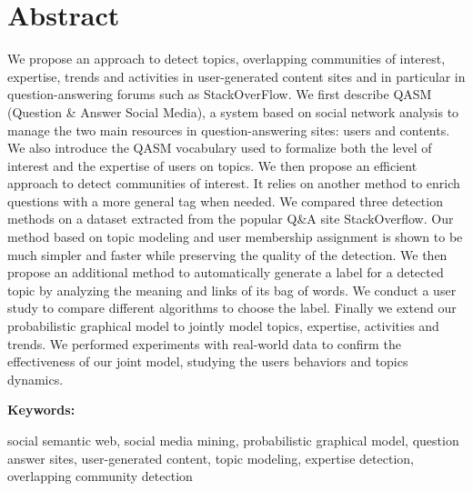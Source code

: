 \documentclass[a4paper,11pt,twoside]{ThesisStyle}
\begin{document}
\section*{Abstract}
We propose an approach to detect topics, overlapping communities of interest, expertise, trends and activities in user-generated content sites and in particular in question-answering forums such as StackOverFlow. We first describe QASM (Question \& Answer Social Media), a system based on social network analysis to manage the two main resources in question-answering sites: users and contents. We also introduce the QASM vocabulary used to formalize both the level of interest and the expertise of users on topics. We then propose an efficient approach to detect communities of interest. It relies on another method to enrich questions with a more general tag when needed.  We compared three detection methods on a dataset extracted from the popular Q\&A site StackOverflow. Our method based on topic modeling and user membership assignment is shown to be much simpler and faster while preserving the quality of the detection. We then propose an additional method to automatically generate a label for a detected topic by analyzing the meaning and links of its bag of words. We conduct a user study to compare different algorithms to choose the label. Finally we extend our probabilistic graphical model to jointly model topics, expertise, activities and trends. We performed experiments with real-world data to confirm the effectiveness of our joint model, studying the users\’ behaviors and topics dynamics.

\textbf{Keywords:}

social semantic web, social media mining, probabilistic graphical model, question answer sites,  user-generated content, topic modeling, expertise detection, overlapping community detection

\cleardoublepage
\end{document}

